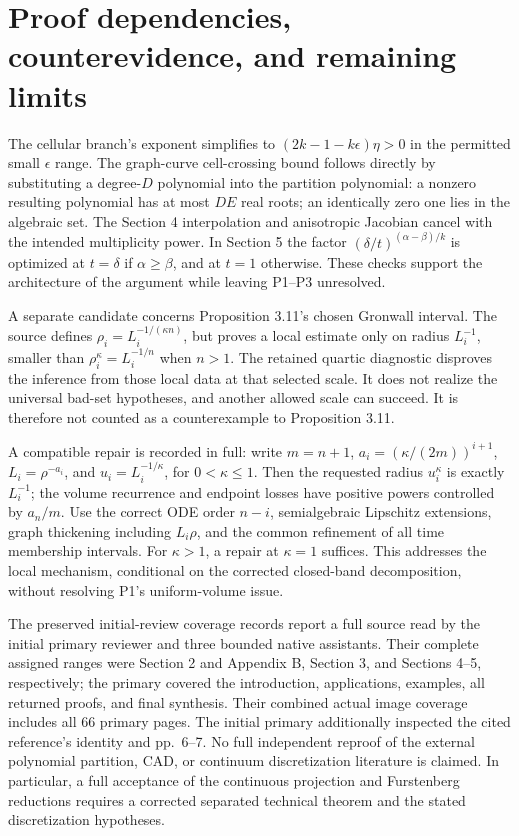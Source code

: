 \documentclass[10pt]{article}
\begin{document}
\section*{Proof dependencies, counterevidence, and remaining limits}
The cellular branch’s exponent simplifies to \((2k-1-k\epsilon)\eta>0\) in the permitted small \(\epsilon\) range. The graph-curve cell-crossing bound follows directly by substituting a degree-\(D\) polynomial into the partition polynomial: a nonzero resulting polynomial has at most \(DE\) real roots; an identically zero one lies in the algebraic set. The Section 4 interpolation and anisotropic Jacobian cancel with the intended multiplicity power. In Section 5 the factor \((\delta/t)^{(\alpha-\beta)/k}\) is optimized at \(t=\delta\) if \(\alpha\ge\beta\), and at \(t=1\) otherwise. These checks support the architecture of the argument while leaving P1–P3 unresolved.\par
A separate candidate concerns Proposition 3.11’s chosen Gronwall interval. The source defines \(\rho_i=L_i^{-1/(\kappa n)}\), but proves a local estimate only on radius \(L_i^{-1}\), smaller than \(\rho_i^\kappa=L_i^{-1/n}\) when \(n>1\). The retained quartic diagnostic disproves the inference from those local data at that selected scale. It does not realize the universal bad-set hypotheses, and another allowed scale can succeed. It is therefore not counted as a counterexample to Proposition 3.11.\par
A compatible repair is recorded in full: write \(m=n+1\), \(a_i=(\kappa/(2m))^{i+1}\), \(L_i=\rho^{-a_i}\), and \(u_i=L_i^{-1/\kappa}\), for \(0<\kappa\le1\). Then the requested radius \(u_i^\kappa\) is exactly \(L_i^{-1}\); the volume recurrence and endpoint losses have positive powers controlled by \(a_n/m\). Use the correct ODE order \(n-i\), semialgebraic Lipschitz extensions, graph thickening including \(L_i\rho\), and the common refinement of all time membership intervals. For \(\kappa>1\), a repair at \(\kappa=1\) suffices. This addresses the local mechanism, conditional on the corrected closed-band decomposition, without resolving P1’s uniform-volume issue.\par
The preserved initial-review coverage records report a full source read by the initial primary reviewer and three bounded native assistants. Their complete assigned ranges were Section 2 and Appendix B, Section 3, and Sections 4–5, respectively; the primary covered the introduction, applications, examples, all returned proofs, and final synthesis. Their combined actual image coverage includes all 66 primary pages. The initial primary additionally inspected the cited reference’s identity and pp. 6–7. No full independent reproof of the external polynomial partition, CAD, or continuum discretization literature is claimed. In particular, a full acceptance of the continuous projection and Furstenberg reductions requires a corrected separated technical theorem and the stated discretization hypotheses.\par
\end{document}
